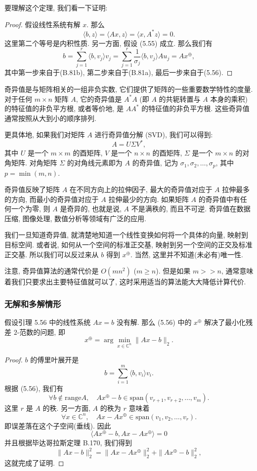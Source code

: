\documentclass[a4paper]{ctexart}
\newcommand{\hl}[1]
{\noindent {\bf {#1}}}
\begin{document}
要理解这个定理, 我们看一下证明: 

\begin{proof}
假设线性系统有解 $x$. 那么
  \[ 
    \langle b, z \rangle = \langle Ax, z \rangle = \langle x, A^* z \rangle = 0. 
  \]
  这里第二个等号是内积性质. 另一方面, 假设 (5.55) 成立. 那么我们有
  \[ 
  b = \sum_{j=1}^{r} \langle b, v_j \rangle v_j 
  = \sum_{j=1}^{r} \frac{1}{\sigma_j} \langle b, v_j \rangle A u_j 
  = Ax^{\oplus}, 
  \]
其中第一步来自于(B.81b), 第二步来自于(B.81a), 最后一步来自于(5.56). 
\end{proof}

奇异值是与矩阵相关的一组非负实数, 它们提供了矩阵的一些重要数学特性的度量. 
对于任何 $m \times n$ 矩阵 $A$, 它的奇异值是 $A^*A$ (即 $A$ 的共轭转置与 $A$ 本身的乘积) 
的特征值的非负平方根, 或者等价地, 是 $AA^*$ 的特征值的非负平方根. 
这些奇异值通常按照从大到小的顺序排列. 

更具体地, 如果我们对矩阵 $A$ 进行奇异值分解 (SVD), 我们可以得到:
\[ 
A = U\Sigma V^*, 
\]
其中 $U$ 是一个 $m \times m$ 的酉矩阵, $V$ 是一个 $n \times n$ 的酉矩阵, 
$\Sigma$ 是一个 $m \times n$ 的对角矩阵. 
对角矩阵 $\Sigma$ 的对角线元素即为 $A$ 的奇异值, 记为
$\sigma_1, \sigma_2, \ldots, \sigma_p$, 其中 $p = \min(m, n)$.

奇异值反映了矩阵 $A$ 在不同方向上的拉伸因子, 最大的奇异值对应于 $A$ 拉伸最多的方向, 
而最小的奇异值对应于 $A$ 拉伸最少的方向. 如果矩阵 $A$ 的奇异值中有任何一个为零, 
则 $A$ 是奇异的, 也就是说, $A$ 不是满秩的, 而且不可逆. 奇异值在数据压缩, 
图像处理, 数值分析等领域有广泛的应用. 

我们一旦知道奇异值, 就清楚地知道一个线性变换如何将一个具体的向量, 映射到目标空间. 或者说, 
如何从一个空间的标准正交基, 映射到另一个空间的正交及标准正交基.
所以我们可以反过来从 $b$ 得到 $x^{\oplus}$. 当然, 这里并不知道(未必有)唯一性. 

注意, 奇异值算法的通常代价是 $O(mn^2)$ ($m \geq n$). 但是如果 $m >> n$, 
通常意味着我们只要求出主要特征值就可以了, 这时采用适当的算法能大大降低计算代价. 


\subsubsection{无解和多解情形}

\hl{定理5.57} 假设引理 5.56 中的线性系统 $Ax = b$ 没有解. 那么 (5.56) 
中的 $x^{\oplus}$ 解决了最小化残差 $2$-范数的问题, 即
\[ 
x^{\oplus} = \arg\min_{x \in \mathbb{C}^n} \|Ax - b\|_2. 
\]

\begin{proof}
$b$ 的傅里叶展开是
\[ 
b = \sum_{i=1}^{m} \langle b, v_i \rangle v_i. 
\]
根据 (5.56), 我们有
\[ 
\forall b \notin \text{range} A, \quad 
Ax^{\oplus} - b \in \text{span}(v_{r+1}, v_{r+2}, \ldots, v_m). 
\]
这里 $r$ 是 $A$ 的秩. 另一方面, $A$ 的秩为 $r$ 意味着
\[ 
\forall x \in \mathbb{C}^n, \quad 
Ax - Ax^{\oplus} \in \text{span}(v_1, v_2, \ldots, v_r). 
\]
即误差落在这个子空间(垂线). 因此
\[ 
\langle Ax^{\oplus} - b, Ax - Ax^{\oplus} \rangle = 0 
\]
并且根据毕达哥拉斯定理 B.170, 我们得到
\[
\|Ax - b\|_2^2 = \|Ax - Ax^{\oplus}\|_2^2 + \|Ax^{\oplus} - b\|_2^2, 
\]
这就完成了证明.
\end{proof}
\end{document}
